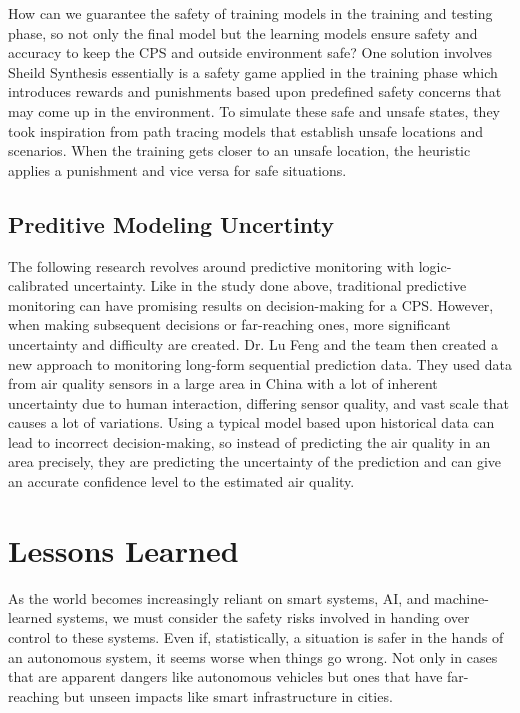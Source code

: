 \documentclass[journal,onecolumn]{IEEEtran}
\begin{document}
How can we guarantee the safety of training models in the training and testing phase, so not only the final model but the learning models ensure safety and accuracy to keep the CPS and outside environment safe? One solution involves Sheild Synthesis essentially is a safety game applied in the training phase which introduces rewards and punishments based upon predefined safety concerns that may come up in the environment. To simulate these safe and unsafe states, they took inspiration from path tracing models that establish unsafe locations and scenarios. When the training gets closer to an unsafe location, the heuristic applies a punishment and vice versa for safe situations. 

\subsection{Preditive Modeling Uncertinty}

The following research revolves around predictive monitoring with logic-calibrated uncertainty. Like in the study done above, traditional predictive monitoring can have promising results on decision-making for a CPS. However, when making subsequent decisions or far-reaching ones, more significant uncertainty and difficulty are created. Dr. Lu Feng and the team then created a new approach to monitoring long-form sequential prediction data. They used data from air quality sensors in a large area in China with a lot of inherent uncertainty due to human interaction, differing sensor quality, and vast scale that causes a lot of variations. Using a typical model based upon historical data can lead to incorrect decision-making, so instead of predicting the air quality in an area precisely, they are predicting the uncertainty of the prediction and can give an accurate confidence level to the estimated air quality. 

\section{Lessons Learned}

As the world becomes increasingly reliant on smart systems, AI, and machine-learned systems, we must consider the safety risks involved in handing over control to these systems. Even if, statistically, a situation is safer in the hands of an autonomous system, it seems worse when things go wrong. Not only in cases that are apparent dangers like autonomous vehicles but ones that have far-reaching but unseen impacts like smart infrastructure in cities.
\end{document}
